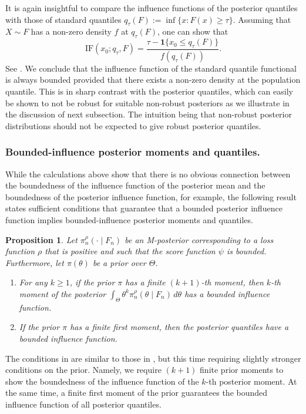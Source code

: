 \documentclass[11pt, oneside]{amsart}
\newtheorem{proposition}{Proposition}
\theoremstyle{definition}   %
\newcommand{\loss}{\rho}
\newcommand{\mposterior}{\pi_n^{\loss}}
\begin{document}
It is again insightful to compare the influence functions of the posterior quantiles with those of standard quantiles $q_\tau(F):=
    \inf  \{ x : F(x)\geq \tau\}$. Assuming that $X\sim F$ has a non-zero density $f$ at $q_\tau(F)$, one can show that 
%
\begin{equation*}
   \textrm{IF}(x_0; q_\tau, F)=\frac{\tau-\mathbf{1}\{x_0\leq q_\tau(F)\}}{f(q_\tau(F))}. 
\end{equation*}
%
See \cite[Ch.\ 3.3.1.]{huber:ronchetti2009}. We conclude that the influence function of the standard quantile functional is always bounded provided that there exists a non-zero density at the population quantile. This is in sharp contrast with the posterior quantiles, which can easily be shown to not be robust for suitable non-robust posteriors as we illustrate in the discussion of next subsection. The intuition being that non-robust posterior distributions should not be expected to give robust posterior quantiles.



\subsubsection{Bounded-influence posterior moments and quantiles.}

While the calculations above show that there is no obvious connection between the boundedness of the influence function of the posterior mean and the boundedness of the posterior influence function, for example, the following result states sufficient conditions that guarantee that a bounded posterior influence function implies bounded-influence posterior moments and quantiles.  
%
\begin{proposition}
\label{prop::connections-to-influence-functions-of-posterior-moments-and-quantiles}
    Let \( \mposterior (\cdot \mid F_n) \) be an M-posterior corresponding to a loss function \(\loss\) that is positive and such that the score function \( \psi\) is bounded. Furthermore, let \( \pi(\theta) \) be a prior over \( \Theta \).
    \begin{enumerate}
        \item For any \(k \geq 1 \), if the prior \( \pi \) has a finite \( (k+1) \)-th moment, then \(k\)-th moment of the posterior  \( \int_\Theta \theta^k \mposterior(\theta \mid F_n) \, d\theta \) has a bounded influence function.
        \item If the prior \( \pi \) has a finite first moment, then the posterior quantiles have a bounded influence function.
    \end{enumerate}
\end{proposition}
%
%
The conditions in  are similar to those in ,  but this time requiring slightly stronger  conditions on the prior. Namely, we require \( (k+1) \) finite prior moments to show the boundedness of the influence function of the \(k\)-th posterior moment. At the same time, a finite first moment of the prior guarantees the bounded influence function of all posterior quantiles. 
%
\end{document}
